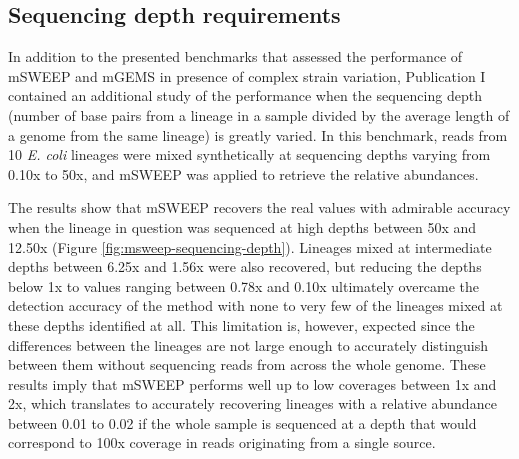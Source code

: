 \documentclass[officiallayout]{tktla}
\begin{document}
\subsection{Sequencing depth requirements}

In addition to the presented benchmarks that assessed the performance
of mSWEEP and mGEMS in presence of complex strain variation,
Publication I contained an additional study of the performance when
the sequencing depth (number of base pairs from a lineage in a sample
divided by the average length of a genome from the same lineage) is
greatly varied. In this benchmark, reads from 10 \textit{E. coli}
lineages were mixed synthetically at sequencing depths varying from
0.10x to 50x, and mSWEEP was applied to retrieve the relative
abundances.

The results show that mSWEEP recovers the real values with
admirable accuracy when the lineage in question was sequenced at high
depths between 50x and 12.50x (Figure
\ref{fig:msweep-sequencing-depth}). Lineages mixed at intermediate
depths between 6.25x and 1.56x were also recovered, but reducing the
depths below 1x to values ranging between 0.78x and 0.10x ultimately
overcame the detection accuracy of the method with none to very few of
the lineages mixed at these depths identified at all. This limitation
is, however, expected since the differences between the lineages are
not large enough to accurately distinguish between them without
sequencing reads from across the whole genome. These results imply
that mSWEEP performs well up to low coverages between 1x and 2x, which
translates to accurately recovering lineages with a relative abundance
between 0.01 to 0.02 if the whole sample is sequenced at a depth that
would correspond to 100x coverage in reads originating from a single
source.
\end{document}
